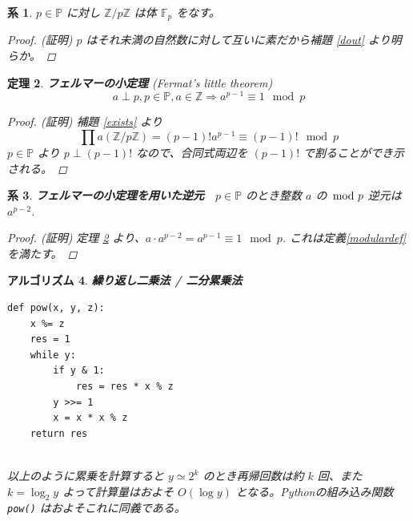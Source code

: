 \documentclass[12pt, a4j]{ltjsarticle}
\newtheorem{thm}{定理}
\newtheorem{cor}[thm]{系}
\newtheorem{alg}[thm]{アルゴリズム}
\newcommand*{\ZZ}{\mathbb{Z}}
\begin{document}
\vspace{1cm}

\begin{cor}\label{bodyp}
$p\in\mathbb{P}$ に対し $\ZZ/p\ZZ$ は体 $\mathbb{F}_p$ をなす。
\begin{proof}(証明)	\itshape
$p$ はそれ未満の自然数に対して互いに素だから補題 \ref{dout} より明らか。
\end{proof}
\end{cor}

\vspace{1cm}

\begin{thm} {\bf フェルマーの小定理} (Fermat's little theorem) \label{Fer}
\begin{equation}
a \perp p, p \in \mathbb{P}, a \in \ZZ \Longrightarrow a^{p-1} \equiv 1 \mod p
\end{equation}
\begin{proof}(証明)	\itshape
補題 \ref{exists} より
\begin{equation}
\prod a(\ZZ/p\ZZ) = (p - 1)!a^{p - 1} \equiv(p - 1)!\mod p
\end{equation}
$p\in\mathbb{P}$ より $p \perp (p-1)!$ なので、合同式両辺を $(p-1)!$ で割ることができ示される。
\end{proof}
\end{thm}

\begin{cor} {\bf フェルマーの小定理を用いた逆元}　$p\in\mathbb{P}$ のとき整数 $a$ の $\hspace{-2mm}\mod p$ 逆元は $a^{p-2}$. \label{FerInv}
\begin{proof}(証明) 定理 \ref{Fer} より、$a\cdot a^{p-2}=a^{p-1}\equiv1\mod p$. これは定義\itshape \ref{modulardef} を満たす。
\end{proof}
\end{cor}

\vspace{1cm}

\begin{alg} {\bf 繰り返し二乗法 / 二分累乗法} \label{xtimespow} \\ \upshape
\begin{lstlisting}
def pow(x, y, z):
    x %= z
    res = 1
    while y:
        if y & 1:
            res = res * x % z
        y >>= 1
        x = x * x % z
    return res
\end{lstlisting}
\quad\\
以上のように累乗を計算すると $y \simeq 2^k$ のとき再帰回数は約 $k$ 回、また $k=\log_2y$ よって計算量はおよそ $O(\log y)$ となる。Pythonの組み込み関数 \lstinline{pow()} はおよそこれに同義である。
\end{alg}
\end{document}
